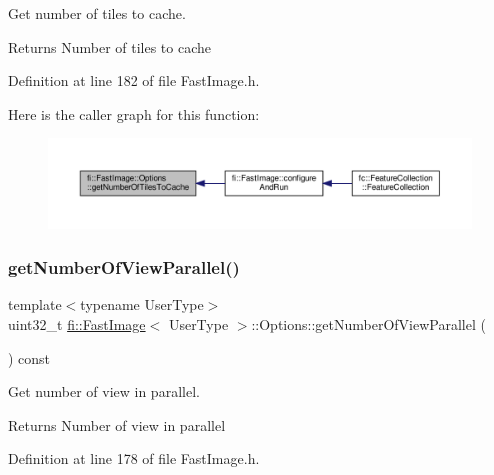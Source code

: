 Get number of tiles to cache. 

\begin{DoxyReturn}{Returns}
Number of tiles to cache 
\end{DoxyReturn}


Definition at line 182 of file Fast\+Image.\+h.

Here is the caller graph for this function\+:
\nopagebreak
\begin{figure}[H]
\begin{center}
\leavevmode
\includegraphics[width=350pt]{dc/db9/classfi_1_1FastImage_1_1Options_a39db813117479230ea638119ac587bab_icgraph}
\end{center}
\end{figure}
\mbox{\label{classfi_1_1FastImage_1_1Options_af9e404f908cbfa016bb1774748948512}} 
\subsubsection{\texorpdfstring{get\+Number\+Of\+View\+Parallel()}{getNumberOfViewParallel()}}
{\footnotesize\ttfamily template$<$typename User\+Type$>$ \\
uint32\+\_\+t \hyperlink{classfi_1_1FastImage}{fi\+::\+Fast\+Image}$<$ User\+Type $>$\+::Options\+::get\+Number\+Of\+View\+Parallel (\begin{DoxyParamCaption}{ }\end{DoxyParamCaption}) const\hspace{0.3cm}{\ttfamily [inline]}}



Get number of view in parallel. 

\begin{DoxyReturn}{Returns}
Number of view in parallel 
\end{DoxyReturn}


Definition at line 178 of file Fast\+Image.\+h.

